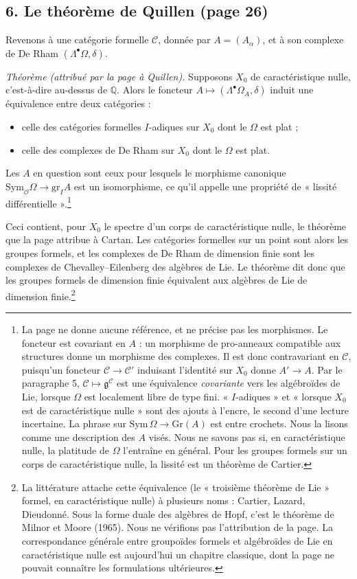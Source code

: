 \documentclass[11pt,a4paper]{article}
\begin{document}
\subsection*{6. Le théorème de Quillen (page 26)}

Revenons à une catégorie formelle $\mathcal{C}$, donnée par $A = (A_\alpha)$,
et à son complexe de De Rham $(\Lambda^{\bullet}\Omega, \delta)$.

\emph{Théorème (attribué par la page à Quillen).} Supposons $X_0$ de
caractéristique nulle, c'est-à-dire au-dessus de $\mathbb{Q}$. Alors le
foncteur $A \mapsto (\Lambda^{\bullet}\Omega_A, \delta)$ induit une
équivalence entre deux catégories :
\begin{itemize}
  \item celle des catégories formelles $I$-adiques sur $X_0$ dont le
  $\Omega$ est plat ;
  \item celle des complexes de De Rham sur $X_0$ dont le $\Omega$ est plat.
\end{itemize}
Les $A$ en question sont ceux pour lesquels le morphisme canonique
$\mathrm{Sym}_{\mathcal{O}}\Omega \to \mathrm{gr}_I A$ est un isomorphisme, ce
qu'il appelle une propriété de « lissité différentielle ».\footnote{La page ne
donne aucune référence, et ne précise pas les morphismes. Le foncteur est
covariant en $A$ : un morphisme de pro-anneaux compatible aux structures donne
un morphisme des complexes. Il est donc contravariant en $\mathcal{C}$,
puisqu'un foncteur $\mathcal{C} \to \mathcal{C}'$ induisant l'identité sur
$X_0$ donne $A' \to A$. Par le paragraphe 5, $\mathcal{C} \mapsto
\mathfrak{g}^{\mathcal{C}}$ est une équivalence \emph{covariante} vers les
algébroïdes de Lie, lorsque $\Omega$ est localement libre de type fini.
« $I$-adiques » et « lorsque $X_0$ est de caractéristique nulle » sont des
ajouts à l'encre, le second d'une lecture incertaine. La phrase sur
$\mathrm{Sym}\,\Omega \to \mathrm{Gr}(A)$ est entre crochets. Nous la lisons
comme une description des $A$ visés. Nous ne savons pas si, en
caractéristique nulle, la platitude de $\Omega$ l'entraîne en général. Pour
les groupes formels sur un corps de caractéristique nulle, la lissité est un
théorème de Cartier.}

Ceci contient, pour $X_0$ le spectre d'un corps de caractéristique nulle, le
théorème que la page attribue à Cartan. Les catégories formelles sur un point
sont alors les groupes formels, et les complexes de De Rham de dimension finie
sont les complexes de Chevalley--Eilenberg des algèbres de Lie. Le théorème dit
donc que les groupes formels de dimension finie équivalent aux algèbres de Lie
de dimension finie.\footnote{La littérature attache cette équivalence (le
« troisième théorème de Lie » formel, en caractéristique nulle) à plusieurs
noms : Cartier, Lazard, Dieudonné. Sous la forme duale des algèbres de Hopf,
c'est le théorème de Milnor et Moore (1965). Nous ne vérifions pas
l'attribution de la page. La correspondance générale entre groupoïdes formels
et algébroïdes de Lie en caractéristique nulle est aujourd'hui un chapitre
classique, dont la page ne pouvait connaître les formulations ultérieures.}
\end{document}
